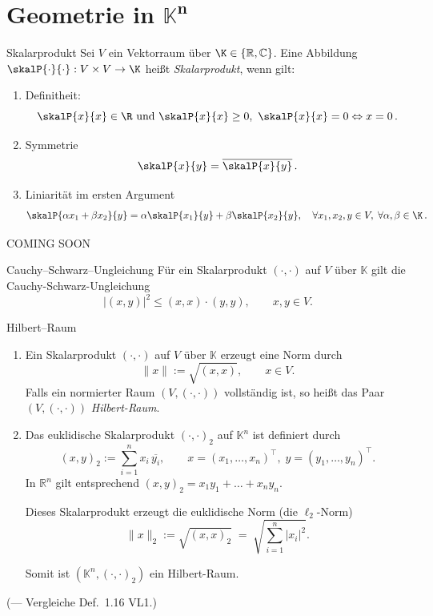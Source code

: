 \newpage
\section{Geometrie in $\mathbf{\mathbb{K}^n}$}
\label{2.4}

\begin{definition}{Skalarprodukt}
    Sei $V$ ein Vektorraum über $\K\in\{\mathbb{R},\mathbb{C}\}$. Eine Abbildung $\skalP{\cdot}{\cdot}:V\times V\to \K$ heißt \emph{Skalarprodukt}, wenn gilt:
    \begin{enumerate}
        \item[S1] Definitheit:
        $$
            \skalP{x}{x} \in \R \text{ und } \skalP{x}{x}\ge 0,\ \skalP{x}{x}=0 \Leftrightarrow x=0\, .
        $$
        \item[S2] Symmetrie
        $$
            \skalP{x}{y} = \overline{\skalP{x}{y}} \, .
        $$
        \item[S3] Liniarität im ersten Argument
        $$
            \skalP{\alpha x_1+ \beta x_2}{y}=\alpha \skalP{x_1}{y} + \beta \skalP{x_2}{y}, \quad \forall x_1, x_2,y \in V, \; \forall \alpha, \beta \in \K \, .
        $$
    \end{enumerate}
\end{definition}

\begin{bemerkungbox}
    COMING SOON
\end{bemerkungbox}

\begin{lemma}{Cauchy--Schwarz--Ungleichung}
    Für ein Skalarprodukt $(\cdot,\cdot)$ auf $V$ über $\mathbb{K}$ gilt die Cauchy-Schwarz-Ungleichung
    $$
    \lvert (x,y)\rvert^2 \le (x,x)\cdot (y,y),\qquad x,y\in V.
    $$
\end{lemma}

\begin{korollar}{Hilbert--Raum}
    \begin{enumerate}
    \item[(a)] Ein Skalarprodukt $(\cdot,\cdot)$ auf $V$ über $\mathbb{K}$ erzeugt eine Norm durch
    $$
    \|x\| := \sqrt{(x,x)},\qquad x\in V.
    $$
    Falls ein normierter Raum $(V,(\cdot,\cdot))$ vollständig ist, so heißt das Paar $(V,(\cdot,\cdot))$ \emph{Hilbert-Raum}.

    \item[(b)] Das euklidische Skalarprodukt $(\cdot,\cdot)_2$ auf $\mathbb{K}^n$ ist definiert durch
    $$
    (x,y)_2 := \sum_{i=1}^n x_i\,\overline{y_i},\qquad x=(x_1,\dots,x_n)^\top,\; y=(y_1,\dots,y_n)^\top.
    $$
    In $\mathbb{R}^n$ gilt entsprechend $(x,y)_2 = x_1 y_1 + \dots + x_n y_n$.

    Dieses Skalarprodukt erzeugt die euklidische Norm (die $\ell_2$-Norm)
    $$
    \|x\|_2 := \sqrt{(x,x)_2} \;=\; \sqrt{\sum_{i=1}^n |x_i|^2}.
    $$

    Somit ist $(\mathbb{K}^n,(\cdot,\cdot)_2)$ ein Hilbert-Raum.
    \end{enumerate}
\end{korollar}
(— Vergleiche Def.\ 1.16 VL1.)


